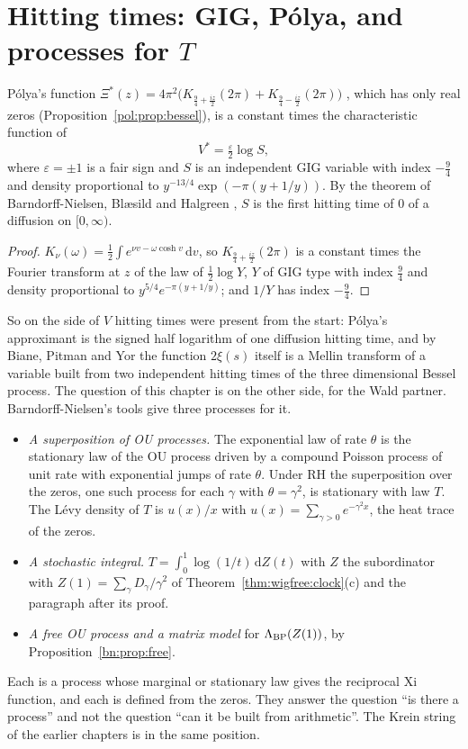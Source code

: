 \section{Hitting times: GIG, P\'olya, and processes for $T$}\label{bn:sec:hit}
\begin{proposition}\label{bn:prop:polya}
P\'olya's function $\Xi^*(z)=4\pi^2\bigl(K_{\frac94+\frac{iz}2}(2\pi)+K_{\frac94-\frac{iz}2}(2\pi)\bigr)$ \cite{Polya}, which has only real zeros (Proposition~\ref{pol:prop:bessel}), is a constant times the characteristic function of
\[
V^*=\tfrac{\varepsilon}{2}\log S,
\]
where $\varepsilon=\pm1$ is a fair sign and $S$ is an independent GIG variable with index $-\frac94$ and density proportional to $y^{-13/4}\exp(-\pi(y+1/y))$. By the theorem of Barndorff-Nielsen, Bl{\ae}sild and Halgreen \cite{BBH78}, $S$ is the first hitting time of $0$ of a diffusion on $[0,\infty)$.
\end{proposition}
\begin{proof}
$K_\nu(\omega)=\frac12\int e^{\nu v-\omega\cosh v}\,\mathrm dv$, so $K_{\frac94+\frac{iz}2}(2\pi)$ is a constant times the Fourier transform at $z$ of the law of $\frac12\log Y$, $Y$ of GIG type with index $\frac94$ and density proportional to $y^{5/4}e^{-\pi(y+1/y)}$; and $1/Y$ has index $-\frac94$.
\end{proof}
So on the side of $V$ hitting times were present from the start: P\'olya's approximant is the signed half logarithm of one diffusion hitting time, and by Biane, Pitman and Yor \cite{BPY01} the function $2\xi(s)$ itself is a Mellin transform of a variable built from two independent hitting times of the three dimensional Bessel process. The question of this chapter is on the other side, for the Wald partner. Barndorff-Nielsen's tools give three processes for it.
\begin{itemize}
\item \textit{A superposition of OU processes.} The exponential law of rate $\theta$ is the stationary law of the OU process driven by a compound Poisson process of unit rate with exponential jumps of rate $\theta$. Under RH the superposition over the zeros, one such process for each $\gamma$ with $\theta=\gamma^2$, is stationary with law $T$. The L\'evy density of $T$ is $u(x)/x$ with $u(x)=\sum_{\gamma>0}e^{-\gamma^2x}$, the heat trace of the zeros.
\item \textit{A stochastic integral.} $T=\int_0^1\log(1/t)\,\mathrm dZ(t)$ with $Z$ the subordinator with $Z(1)=\sum_\gamma D_\gamma/\gamma^2$ of Theorem~\ref{thm:wigfree:clock}(c) and the paragraph after its proof.
\item \textit{A free OU process and a matrix model} for $\Lambda_{\rm BP}(Z(1))$, by Proposition~\ref{bn:prop:free}.
\end{itemize}
Each is a process whose marginal or stationary law gives the reciprocal Xi function, and each is defined from the zeros. They answer the question ``is there a process'' and not the question ``can it be built from arithmetic''. The Krein string of the earlier chapters is in the same position.

